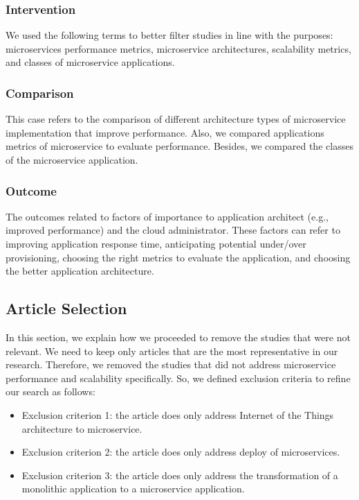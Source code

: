 \subsubsection{Intervention}
We used the following terms to better filter studies in line with the purposes: microservices performance metrics, microservice architectures, scalability metrics, and classes of microservice applications. 

\subsubsection{Comparison}
This case refers to the comparison of different architecture types of microservice implementation that improve performance. Also, we compared applications metrics of microservice to evaluate performance. Besides, we compared the classes of the microservice application. 

\subsubsection{Outcome}
The outcomes related to factors of importance to application architect (e.g., improved performance) and the cloud administrator. These factors can refer to improving application response time, anticipating potential under/over provisioning, choosing the right metrics to evaluate the application, and choosing the better application architecture.

\subsection{Article Selection}
\label{selection}
In this section, we explain how we proceeded to remove the studies that were not relevant. We need to keep only articles that are the most representative in our research. Therefore, we removed the studies that did not address microservice performance and scalability specifically. So, we defined exclusion criteria to refine our search as follows:

\begin{itemize}
\item Exclusion criterion 1: the article does only address Internet of the Things architecture to microservice.
\item Exclusion criterion 2: the article does only address deploy of microservices.
\item Exclusion criterion 3: the article does only address the transformation of a monolithic application to a microservice application.
\end{itemize}

